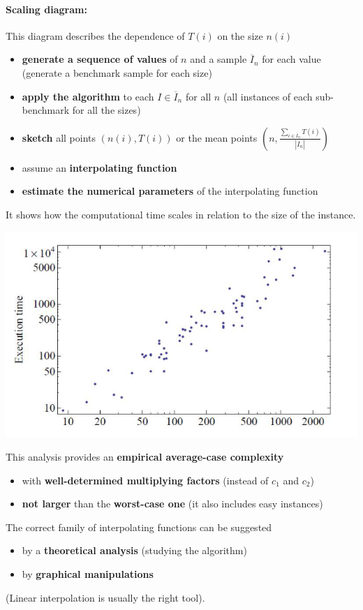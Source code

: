 \newpage

\paragraph{Scaling diagram:} This diagram describes the dependence of $T (i )$ on the size $n (i )$
\begin{itemize}
	\item \textbf{generate a sequence of values} of $n$ and a sample $\overline{I}_n$ for each value (generate a benchmark sample for each size)
	\item \textbf{apply the algorithm} to each $I \in \overline{I}_n$ for all $n$ (all instances of each sub-benchmark for all the sizes)
	\item \textbf{sketch} all points $(n (i ) , T (i ))$ or the mean points $\left(n, \frac{\sum_{i \in \overline{I}_n} T(i)}{|\overline{I}_n|}\right)$ 
	\item assume an \textbf{interpolating function}
	\item \textbf{estimate the numerical parameters} of the interpolating function
\end{itemize}
It shows how the computational time scales in relation to the size of the instance.
\begin{center}
	\includegraphics[width=0.7\columnwidth]{img/SD1}
\end{center}
This analysis provides an \textbf{empirical average-case complexity}
\begin{itemize}
	\item with \textbf{well-determined multiplying factors} (instead of $c_1$ and $c_2$)
	\item \textbf{not larger} than the \textbf{worst-case one} (it also includes easy instances)
\end{itemize}

\newpage

The correct family of interpolating functions can be suggested
\begin{itemize}
	\item by a \textbf{theoretical analysis} (studying the algorithm)
	\item by \textbf{graphical manipulations}
\end{itemize}
(Linear interpolation is usually the right tool).\\

